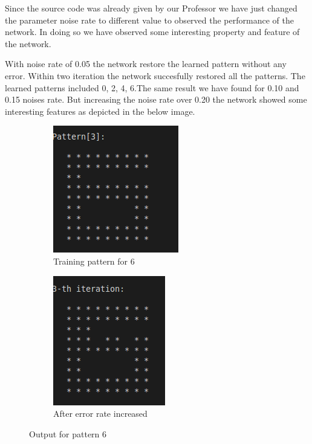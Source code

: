 \documentclass{article}
\begin{document}
Since the source code was already given by our Professor we have just changed
the parameter noise rate to different value to observed the performance of the
network. In doing so we have observed some interesting property and feature of
the network.

With noise rate of 0.05 the network restore the learned pattern without any
error. Within two iteration the network succesfully restored all the patterns.
The learned patterns included 0, 2, 4, 6.The same result we have found for 0.10 
and 0.15 noises rate. But increasing the noise rate over 0.20 the 
network showed some interesting features as depicted in the below image. 

\begin{figure}
\centering
\begin{subfigure}{.5\textwidth}
  \centering
  \includegraphics[width=.4\linewidth]{sixd.png}
  \caption{Training pattern for 6}
  \label{fig:sixt}
\end{subfigure}%
\begin{subfigure}{.5\textwidth}
  \centering
  \includegraphics[width=.4\linewidth]{six3.png}
  \caption{After error rate increased}
  \label{fig:six3}
\end{subfigure}
\caption{Output for pattern 6}
\label{fig:one}
\end{figure}
\end{document}
